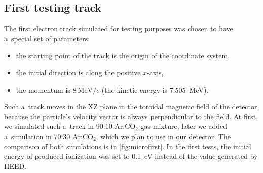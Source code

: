 		\subsection{First testing track}
		\label{sec:microfirst}
			The first electron track simulated for testing purposes was chosen to have a~special set of parameters:
				\begin{itemize}[nosep]
					\item the starting point of the track is the origin of the coordinate system,
					\item the initial direction is along the positive $x$-axis,
					\item the momentum is $8~\text{MeV}/c$ (the kinetic energy is 7.505~MeV).
				\end{itemize}
			Such a~track moves in the XZ plane in the toroidal magnetic field of the detector, because the particle's velocity vector is always perpendicular to the field. At first, we simulated such a~track in 90:10 Ar:CO$_2$ gas mixture, later we added a~simulation in 70:30 Ar:CO$_2$, which we plan to use in our detector. The comparison of both simulations is in \cref{fig:microfirst}. In the first tests, the initial energy of produced ionization was set to \qty{0.1}{\eV} instead of the value generated by \ac{HEED}.
			
